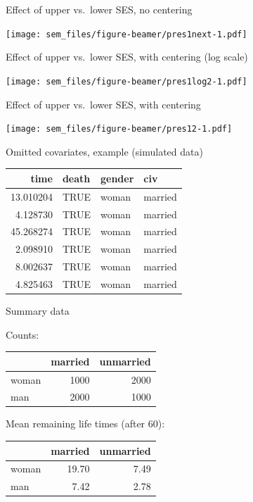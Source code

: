 \begin{frame}{Effect of upper vs.~lower SES, no centering}

\texttt{[image: sem\_files/figure-beamer/pres1next-1.pdf]}

\end{frame}

\begin{frame}{Effect of upper vs.~lower SES, with centering (log scale)}

\texttt{[image: sem\_files/figure-beamer/pres1log2-1.pdf]}

\end{frame}

\begin{frame}{Effect of upper vs.~lower SES, with centering}

\texttt{[image: sem\_files/figure-beamer/pres12-1.pdf]}

\end{frame}

\begin{frame}{Omitted covariates, example (simulated data)}

\begin{longtable}[c]{@{}rlll@{}}
\toprule
time & death & gender & civ\tabularnewline
\midrule
\endhead
13.010204 & TRUE & woman & married\tabularnewline
4.128730 & TRUE & woman & married\tabularnewline
45.268274 & TRUE & woman & married\tabularnewline
2.098910 & TRUE & woman & married\tabularnewline
8.002637 & TRUE & woman & married\tabularnewline
4.825463 & TRUE & woman & married\tabularnewline
\bottomrule
\end{longtable}

\end{frame}

\begin{frame}{Summary data}

Counts:

\begin{longtable}[c]{@{}lrr@{}}
\toprule
& married & unmarried\tabularnewline
\midrule
\endhead
woman & 1000 & 2000\tabularnewline
man & 2000 & 1000\tabularnewline
\bottomrule
\end{longtable}

Mean remaining life times (after 60):

\begin{longtable}[c]{@{}lrr@{}}
\toprule
& married & unmarried\tabularnewline
\midrule
\endhead
woman & 19.70 & 7.49\tabularnewline
man & 7.42 & 2.78\tabularnewline
\bottomrule
\end{longtable}

\end{frame}

